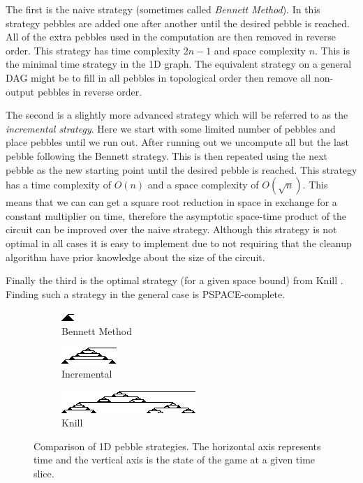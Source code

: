 The first is the naive strategy (sometimes called \emph{Bennett Method}). In
this strategy pebbles are added one after another until the desired pebble is
reached.  All of the extra pebbles used in the computation are then removed in
reverse order. This strategy has time complexity $2n-1$ and space complexity
$n$. This is the minimal time strategy in the 1D graph. The equivalent strategy
on a general DAG might be to fill in all pebbles in topological order then
remove all non-output pebbles in reverse order.

The second is a slightly more advanced strategy which will be referred to as
the \emph{incremental strategy}. Here we start with some limited number of
pebbles and place pebbles until we run out. After running out we uncompute all
but the last pebble following the Bennett strategy. This is then repeated using
the next pebble as the new starting point until the desired pebble is reached.
This strategy has a time complexity of $O(n)$ and a space complexity of
$O(\sqrt n)$. This means that we can can get a square root reduction in space
in exchange for a constant multiplier on time, therefore the asymptotic
space-time product of the circuit can be improved over the naive strategy.
Although this strategy is not optimal in all cases it is easy to implement due
to not requiring that the cleanup algorithm have prior knowledge about the size
of the circuit.

Finally the third is the optimal strategy (for a given space bound) from Knill
\cite{knill:95}. Finding such a strategy in the general case is
PSPACE-complete.  



\begin{figure}
  \centering
  \begin{subfigure}{0.3\textwidth}
    \centering
    \includegraphics{images/Pebble1.png}
    \caption{Bennett Method}
  \end{subfigure}
  \begin{subfigure}{0.3\textwidth}
    \centering
    \includegraphics{images/Pebble2.png}
    \caption{Incremental}
  \end{subfigure}\begin{subfigure}{0.3\textwidth}
    \centering
    \includegraphics{images/Pebble3.png}
    \caption{Knill}
  \end{subfigure}
  \label{fig:pebble}
  \caption{Comparison of 1D pebble strategies. The horizontal axis represents
  time and the vertical axis is the state of the game at a given time slice.}
\end{figure}

